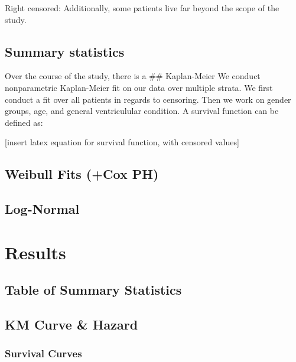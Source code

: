 \documentclass[
]{article}
\begin{document}
Right censored: Additionally, some patients live far beyond the scope of
the study.

\hypertarget{summary-statistics}{%
\subsection{Summary statistics}\label{summary-statistics}}

Over the course of the study, there is a \#\# Kaplan-Meier We conduct
nonparametric Kaplan-Meier fit on our data over multiple strata. We
first conduct a fit over all patients in regards to censoring. Then we
work on gender groups, age, and general ventriculular condition. A
survival function can be defined as:

{[}insert latex equation for survival function, with censored values{]}

\hypertarget{weibull-fits-cox-ph}{%
\subsection{Weibull Fits (+Cox PH)}\label{weibull-fits-cox-ph}}

\hypertarget{log-normal}{%
\subsection{Log-Normal}\label{log-normal}}

\hypertarget{results-1}{%
\section{Results}\label{results-1}}

\hypertarget{table-of-summary-statistics}{%
\subsection{Table of Summary
Statistics}\label{table-of-summary-statistics}}

\hypertarget{km-curve-hazard}{%
\subsection{KM Curve \& Hazard}\label{km-curve-hazard}}

\hypertarget{survival-curves}{%
\subsubsection{Survival Curves}\label{survival-curves}}
\end{document}
